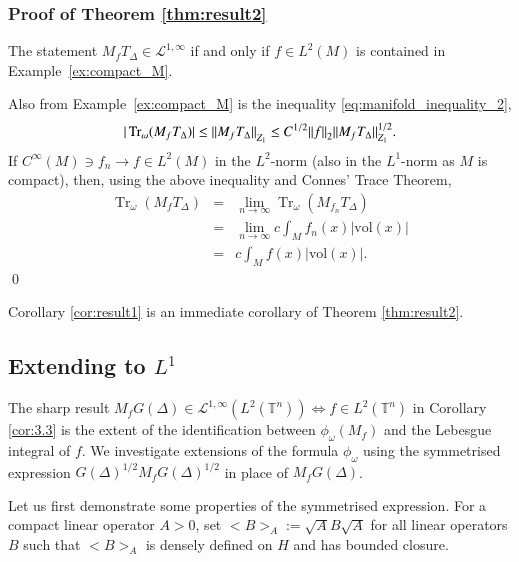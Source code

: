 \documentclass[final,1p]{elsarticle}
\numberwithin{equation}{section}
\theoremstyle{plain}
\theoremstyle{definition}
\newcounter{prop2count}
\begin{document}
\subsubsection*{Proof of Theorem \ref{thm:result2}}

\medskip The statement $M_f T_\Delta \in \mathcal{L}^{1,\infty}$ if and only
if $f \in L^2(M)$ is contained in
Example~\ref{ex:compact_M}.

Also from Example~\ref{ex:compact_M} is the inequality \eqref{eq:manifold_inequality_2},
$$
|\operatorname{Tr}_\omega(M_f T_\Delta)|
\leq {\mbox{\ensuremath{\| {M_f T_\Delta} \|}}}_{Z_1}
\leq C^{1/2} {\mbox{\ensuremath{\| {f} \|}}}_2 {\mbox{\ensuremath{\| {M_f T_\Delta} \|}}}_{Z_1}^{1/2} .
$$
If $C^\infty(M) \ni f_n \to f \in L^2(M)$
in the $L^2$-norm (also in the $L^1$-norm as $M$ is compact),
then, using the above inequality and Connes'
Trace Theorem,
\begin{eqnarray*}
\operatorname{Tr}_\omega(M_{f} T_\Delta)
& = & \lim_{n \to \infty} \operatorname{Tr}_\omega(M_{f_n} T_\Delta) \\
& = & \lim_{n \to \infty} c \int_M f_n(x) |\mathrm{vol}(x)| \\
& = & c \int_M f(x) |\mathrm{vol}(x)| .
\end{eqnarray*}
\qed

\medskip Corollary \ref{cor:result1} is an immediate corollary of Theorem \ref{thm:result2}.

\subsection{Extending to $L^1$} \label{sec:6}

\medskip The sharp result $M_f G(\Delta) \in \mathcal{L}^{1,\infty}(L^2({\ensuremath{\mathbb{T}}}^n)) \Leftrightarrow f \in L^2({\ensuremath{\mathbb{T}}}^n)$ in Corollary \ref{cor:3.3} is the extent of the identification between
$\phi_\omega(M_f)$ and the Lebesgue integral of $f$.  We investigate
extensions of the formula $\phi_\omega$ using the symmetrised expression
$G(\Delta)^{1/2} M_{f} G(\Delta)^{1/2}$ in place of $M_f G(\Delta)$.

Let us first demonstrate some properties of the symmetrised expression. For a compact linear operator $A > 0$, set
${\ensuremath{\big< {B} \big>_{{A}}}} := \sqrt{A}B\sqrt{A}$ for all linear operators $B$ such that ${\ensuremath{\big< {B} \big>_{{A}}}}$ is densely defined on $H$ and has bounded closure.  
\end{document}
